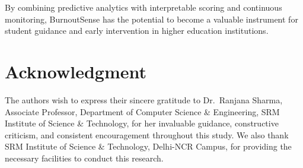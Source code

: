 \documentclass[conference]{IEEEtran}
\begin{document}
By combining predictive analytics with interpretable scoring and continuous monitoring, BurnoutSense has the potential to become a valuable instrument for student guidance and early intervention in higher education institutions.

\section*{Acknowledgment}

The authors wish to express their sincere gratitude to Dr.~Ranjana Sharma, Associate Professor, Department of Computer Science \& Engineering, SRM Institute of Science \& Technology, for her invaluable guidance, constructive criticism, and consistent encouragement throughout this study. We also thank SRM Institute of Science \& Technology, Delhi-NCR Campus, for providing the necessary facilities to conduct this research.
\end{document}
